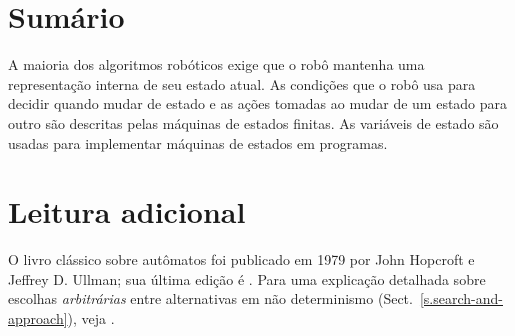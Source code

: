\section{Sumário}

A maioria dos algoritmos robóticos exige que o robô mantenha uma representação interna de seu estado atual. As condições que o robô usa para decidir quando mudar de estado e as ações tomadas ao mudar de um estado para outro são descritas pelas máquinas de estados finitas. As variáveis de estado são usadas para implementar máquinas de estados em programas.

\section{Leitura adicional}

O livro clássico sobre autômatos foi publicado em 1979 por John Hopcroft e Jeffrey D. Ullman; sua última edição é \cite{automata}. Para uma explicação detalhada sobre escolhas  \emph{arbitrárias} entre alternativas em não determinismo (Sect.~\ref{s.search-and-approach}), veja \cite[sect.~2.4]{pcdp2}.
